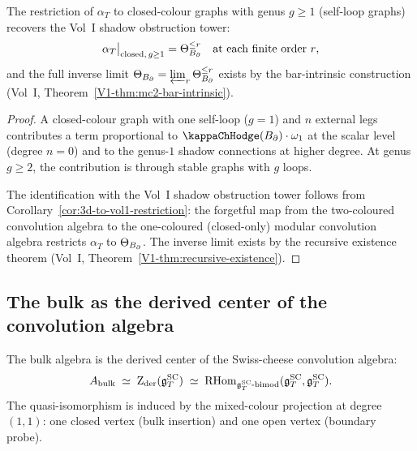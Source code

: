 \begin{theorem}
The restriction of $\alpha_T$ to closed-colour graphs with
genus $g\ge 1$ (self-loop graphs) recovers the Vol~I shadow
obstruction tower:
\begin{equation}%
\alpha_T\big|_{\mathrm{closed},\,g\ge 1}
= \Theta_{\Bbound}^{\le r}
\quad\text{at each finite order $r$},
\end{equation}
and the full inverse limit $\Theta_{B_{\partial}}
= \varprojlim_r\Theta_{B_{\partial}}^{\le r}$ exists by the
bar-intrinsic construction
\textup{(}Vol~I, Theorem~\textup{\ref*{V1-thm:mc2-bar-intrinsic}}\textup{)}.
\end{theorem}

\begin{proof}
A closed-colour graph with one self-loop ($g=1$) and $n$ external
legs contributes a term proportional to $\kappaChHodge(\Bbound)\cdot\omega_1$
at the scalar level (degree $n=0$) and to the genus-$1$ shadow
connections at higher degree. At genus $g\ge 2$, the contribution
is through stable graphs with $g$ loops.

The identification with the Vol~I shadow obstruction tower follows from
Corollary~\ref{cor:3d-to-vol1-restriction}: the forgetful map
from the two-coloured convolution algebra to the one-coloured
(closed-only) modular convolution algebra restricts $\alpha_T$
to $\Theta_{B_{\partial}}$. The inverse limit exists by the recursive
existence theorem (Vol~I, Theorem~\ref*{V1-thm:recursive-existence}).
\end{proof}


\subsection{The bulk as the derived center of the convolution algebra}

\begin{theorem}
The bulk algebra is the derived center of the Swiss-cheese
convolution algebra:
\begin{equation}%
\Abulk
\;\simeq\;
\Zder(\gSC_T)
\;\simeq\;
\RHom_{\gSC_T\text{-bimod}}(\gSC_T,\gSC_T).
\end{equation}
The quasi-isomorphism is induced by the mixed-colour projection
at degree $(1,1)$: one closed vertex (bulk insertion) and one
open vertex (boundary probe).
\end{theorem}

